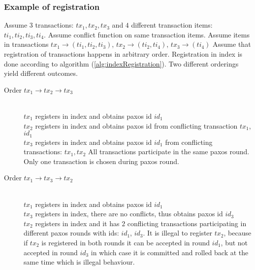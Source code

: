 \subsubsection{Example of registration}
Assume $3$ transactions: $tx_{1}, tx_{2}, tx_{3}$ and $4$ different transaction items: $ti_{1}, ti_{2}, ti_{3}, ti_{4}$. Assume conflict function on same transaction items.
Assume items in transactions $tx_{1} \rightarrow (ti_{1}, ti_{2}, ti_{3})$, 
 $tx_{2} \rightarrow (ti_{2}, ti_{4})$, $tx_{3} \rightarrow (ti_{4})$
Assume that registration of transactions happens in arbitrary order. Registration in index is done according to algorithm (\ref{alg:indexRegistration}). Two different orderings yield different outcomes. 
 \begin{description}
 \item[Order $tx_{1} \rightarrow tx_{2} \rightarrow tx_{3}$] \hfill \\
 	$tx_{1}$ registers in index and obtains paxos id $id_{1}$ \\
 	$tx_{2}$ registers in index and obtains paxos id from conflicting transaction $tx_{1}$, $id_{1}$ \\
 	$tx_{3}$ registers in index and obtains paxos id $id_{1}$ from conflicting transactions: $tx_{1}, tx_{2}$ All transactions participate in the same paxos round. Only one transaction is chosen during paxos round. 
 \item[Order $tx_{1} \rightarrow tx_{3} \rightarrow tx_{2}$] \hfill \\
 	$tx_{1}$ registers in index and obtains paxos id $id_{1}$ \\
 	$tx_{3}$ registers in index, there are no conflicts, thus obtains paxos id $id_{3}$\\
 	$tx_{2}$ registers in index and it has $2$ conflicting transactions participating in different paxos rounds with ids: $id_{1}$, $id_{3}$. It is illegal to register $tx_{2}$, because if $tx_{2}$ is registered in both rounds it can be accepted in round $id_{1}$, but not accepted in round $id_{3}$ in which case it is committed and rolled back at the same time which is illegal behaviour. 

 \end{description}




